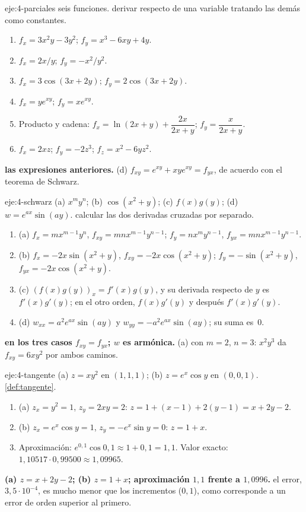 \begin{solucion}{eje:4-parciales}
\datos seis funciones.
\planteamiento derivar respecto de una variable tratando las demás como constantes.
\pasos
\begin{enumerate}[label=(\alph*)]
  \item $f_x=3x^2y-3y^2$; $f_y=x^3-6xy+4y$.
  \item $f_x=2x/y$; $f_y=-x^2/y^2$.
  \item $f_x=3\cos(3x+2y)$; $f_y=2\cos(3x+2y)$.
  \item $f_x=ye^{xy}$; $f_y=xe^{xy}$.
  \item Producto y cadena: $f_x=\ln(2x+y)+\dfrac{2x}{2x+y}$; $f_y=\dfrac{x}{2x+y}$.
  \item $f_x=2xz$; $f_y=-2z^3$; $f_z=x^2-6yz^2$.
\end{enumerate}
\resultado \textbf{las expresiones anteriores.}
\comprobacion (d) $f_{xy}=e^{xy}+xye^{xy}=f_{yx}$, de acuerdo con el teorema de Schwarz.
\end{solucion}

\begin{solucion}{eje:4-schwarz}
\datos (a) $x^my^n$; (b) $\cos(x^2+y)$; (c) $f(x)g(y)$; (d) $w=e^{ax}\sin(ay)$.
\planteamiento calcular las dos derivadas cruzadas por separado.
\pasos
\begin{enumerate}[label=\arabic*.]
  \item (a) $f_x=mx^{m-1}y^n$, $f_{xy}=mnx^{m-1}y^{n-1}$; $f_y=nx^my^{n-1}$, $f_{yx}=mnx^{m-1}y^{n-1}$.
  \item (b) $f_x=-2x\sin(x^2+y)$, $f_{xy}=-2x\cos(x^2+y)$; $f_y=-\sin(x^2+y)$, $f_{yx}=-2x\cos(x^2+y)$.
  \item (c) $(f(x)g(y))_x=f'(x)g(y)$, y su derivada respecto de $y$ es $f'(x)g'(y)$; en el otro orden, $f(x)g'(y)$ y después $f'(x)g'(y)$.
  \item (d) $w_{xx}=a^2e^{ax}\sin(ay)$ y $w_{yy}=-a^2e^{ax}\sin(ay)$; su suma es~0.
\end{enumerate}
\resultado \textbf{en los tres casos $f_{xy}=f_{yx}$; $w$ es armónica.}
\comprobacion (a) con $m=2$, $n=3$: $x^2y^3$ da $f_{xy}=6xy^2$ por ambos caminos.
\end{solucion}

\begin{solucion}{eje:4-tangente}
\datos (a) $z=xy^2$ en $(1,1,1)$; (b) $z=e^x\cos y$ en $(0,0,1)$.
\planteamiento \cref{def:tangente}.
\pasos
\begin{enumerate}[label=\arabic*.]
  \item (a) $z_x=y^2=1$, $z_y=2xy=2$: $z=1+(x-1)+2(y-1)=x+2y-2$.
  \item (b) $z_x=e^x\cos y=1$, $z_y=-e^x\sin y=0$: $z=1+x$.
  \item Aproximación: $e^{0{,}1}\cos0{,}1\approx1+0{,}1=1{,}1$. Valor exacto: $1{,}10517\cdot0{,}99500\approx1{,}09965$.
\end{enumerate}
\resultado \textbf{(a) $z=x+2y-2$; (b) $z=1+x$; aproximación $1{,}1$ frente a $1{,}0996$.}
\comprobacion el error, $3{,}5\cdot10^{-4}$, es mucho menor que los incrementos ($0{,}1$), como corresponde a un error de orden superior al primero.
\end{solucion}

